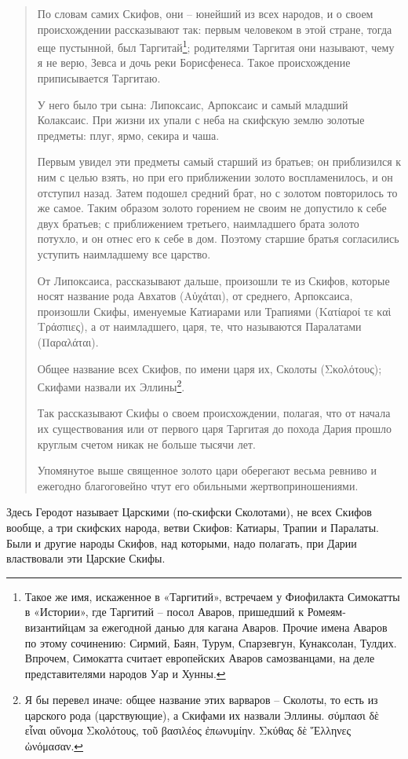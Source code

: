 \begin{quotation}
По словам самих Скифов, они – юнейший из всех народов, и о своем происхождении рассказывают так: первым человеком в этой стране, тогда еще пустынной, был Таргитай\footnote{Такое же имя, искаженное в «Таргитий», встречаем у Фиофилакта Симокатты в «Истории», где Таргитий – посол Аваров, пришедший к Ромеям-византийцам за ежегодной данью для кагана Аваров. Прочие имена Аваров по этому сочинению: Сирмий, Баян, Турум, Спарзевгун, Кунаксолан, Тулдих. Впрочем, Симокатта считает европейских Аваров самозванцами, на деле представителями народов Уар и Хунны.}; родителями Таргитая они называют, чему я не верю, Зевса и дочь реки Борисфенеса. Такое происхождение приписывается Таргитаю.

У него было три сына: Липоксаис, Арпоксаис и самый младший Колаксаис. При жизни их упали с неба на скифскую землю золотые предметы: плуг, ярмо, секира и чаша.

Первым увидел эти предметы самый старший из братьев; он приблизился к ним с целью взять, но при его приближении золото воспламенилось, и он отступил назад. Затем подошел средний брат, но с золотом повторилось то же самое. Таким образом золото горением не своим не допустило к себе двух братьев; с приближением третьего, наимладшего брата золото потухло, и он отнес его к себе в дом. Поэтому старшие братья согласились уступить наимладшему все царство.

От Липоксаиса, рассказывают дальше, произошли те из Скифов, которые носят название рода Авхатов (Αὐχάται), от среднего, Арпоксаиса, произошли Скифы, именуемые Катиарами или Трапиями (Κατίαροί τε καὶ Τράσπιες), а от наимладшего, царя, те, что называются Паралатами (Παραλάται). 

Общее название всех Скифов, по имени царя их, Сколоты (Σκολότους); Скифами назвали их Эллины\footnote{Я бы перевел иначе: общее название этих варваров – Сколоты, то есть из царского рода (царствующие), а Скифами их назвали Эллины. σύμπασι δὲ εἶναι οὔνομα Σκολότους, τοῦ βασιλέος ἐπωνυμίην. Σκύθας δὲ Ἕλληνες ὠνόμασαν.}.

Так рассказывают Скифы о своем происхождении, полагая, что от начала их существования или от первого царя Таргитая до похода Дария прошло круглым счетом никак не больше тысячи лет.

Упомянутое выше священное золото цари оберегают  весьма ревниво и ежегодно благоговейно чтут его обильными жертвоприношениями.
\end{quotation}

Здесь Геродот называет Царскими (по-скифски Сколотами), не всех Скифов вообще, а три скифских народа, ветви Скифов: Катиары, Трапии и Паралаты. Были и другие народы Скифов, над которыми, надо полагать, при Дарии властвовали эти Царские Скифы.


